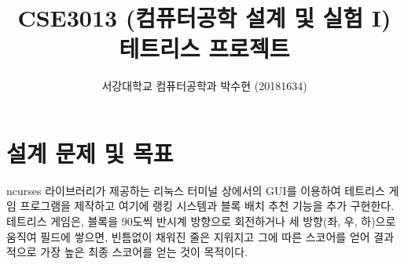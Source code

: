 

\usepackage{color}
\usepackage{pgfplots}

\newdimen\omsq     \omsq=20pt
\newdimen\omrule   \omrule=2pt
\newdimen\omint

\newif\ifvth    \newif\ifhth    \newif\ifomblank
\def\OMINO#1{%
    \vthtrue \hthtrue
    \vbox{ \offinterlineskip\parindent=0pt \OM#1\relax\vskip1pt}
    }

\def\OM#1{%
    \omint=\omsq    \advance\omint-\omrule
    \ifx\relax#1%
    \else
      \ifx\\#1 \newline\null \hthtrue \ifvth\vthfalse\else\vskip-\omrule\vthtrue\fi
      \else%
        \ifx .#1\hskip\ifhth \omrule\else \omint\fi
        \else%
          \ifx +#1\def\colour{black}\fi%
          \ifx -#1\def\colour{black}\fi%
          \ifx |#1\def\colour{black}\fi%
          \ifx @#1\def\colour{black}\fi%
          \ifx X#1\def\colour{gray}\fi%
          \ifx Z#1\def\colour{red}\fi%
          \ifx S#1\def\colour{green}\fi%
          \ifx L#1\def\colour{orange}\fi%
          \ifx J#1\def\colour{blue}\fi%
          \ifx O#1\def\colour{yellow}\fi%
          \ifx T#1\def\colour{magenta}\fi%
          \ifx I#1\def\colour{cyan}\fi%
          \textcolor{\colour}{\rule{\ifhth\omrule\else\omsq\fi}{\ifvth\omrule\else\omsq\fi}}%
          \ifhth\else\hskip -\omrule\fi%
        \fi%
        \ifhth\hthfalse\else\hthtrue\fi%
      \fi%
    \expandafter\OM%
    \fi}

\makeatother

\usepackage{wrapfig}
\usepackage{subfig}

\renewcommand{\arraystretch}{1.2}
\renewcommand{\baselinestretch}{1.1}


\title{CSE3013 (컴퓨터공학 설계 및 실험 I) \space \newline 테트리스 프로젝트}
\author{서강대학교 컴퓨터공학과 박수현 (20181634)}
\maketitle

\section{설계 문제 및 목표}
ncurses 라이브러리가 제공하는 리눅스 터미널 상에서의 GUI를 이용하여 테트리스 게임 프로그램을 제작하고 여기에 랭킹 시스템과 블록 배치 추천 기능을 추가 구현한다.
테트리스 게임은, 블록을 90도씩 반시계 방향으로 회전하거나 세 방향(좌, 우, 하)으로 움직여 필드에 쌓으면, 빈틈없이 채워진 줄은 지워지고 그에 따른 스코어를 얻어 결과적으로 가장 높은 최종 스코어를 얻는 것이 목적이다. 

